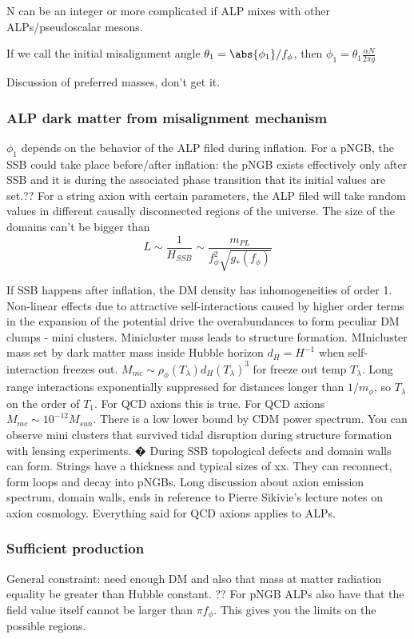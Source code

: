 \documentclass[12pt, twoside]{book}
\begin{document}
N can be an integer or more complicated if ALP mixes with other ALPs/pseudoscalar mesons.

If we call the initial misalignment angle $\theta_1 = \abs{\phi_1}/f_{\phi}$, then $\phi_1 = \theta_1 \frac{\alpha N}{2 \pi g}$

Discussion of preferred masses, don't get it.

\subsubsection{ALP dark matter from misalignment mechanism}

$\phi_1$ depends on the behavior of the ALP filed during inflation. For a pNGB, the SSB could take place before/after inflation: the pNGB exists effectively only after SSB and it is during the associated phase transition that its initial values are set.?? For a string axion with certain parameters, the ALP filed will take random values in different causally disconnected regions of the universe. The size of the domains can't be bigger than
\[
L \sim \frac{1}{H_{SSB}} \sim \frac{m_{PL}}{f_\phi^2\sqrt{g_*(f_\phi)}}
\]

If SSB happens after inflation, the DM density has inhomogeneities of order 1. Non-linear effects due to attractive self-interactions caused by higher order terms in the expansion of the potential drive the overabundances to form peculiar DM clumps - mini clusters. Minicluster mass leads to structure formation. MInicluster mass set by dark matter mass inside Hubble horizon $d_H = H^{-1}$ when self-interaction freezes out. $M_{mc} \sim \rho_{\phi}(T_\lambda)d_H(T_\lambda)^3$ for freeze out temp $T_\lambda$. Long range interactions exponentially suppressed for distances longer than $1/m_\phi$, so $T_\lambda$ on the order of $T_1$. For QCD axions this is true. For QCD axions $M_{mc} \sim 10^{-12} M_{sun}$. There is a low lower bound by CDM power spectrum.
You can observe mini clusters that survived tidal disruption during structure formation with lensing experiments. �
During SSB topological defects and domain walls can form. Strings have a thickness and typical sizes of xx. They can reconnect, form loops and decay into pNGBs. Long discussion about axion emission spectrum, domain walls, ends in reference to Pierre Sikivie's lecture notes on axion cosmology. Everything said for QCD axions applies to ALPs.

\subsubsection{Sufficient production}
General constraint: need enough DM and also that mass at matter radiation equality be greater than Hubble constant. ??
For pNGB ALPs also have that the field value itself cannot be larger than $\pi f_\phi$. This gives you the limits on the possible regions.
\end{document}
